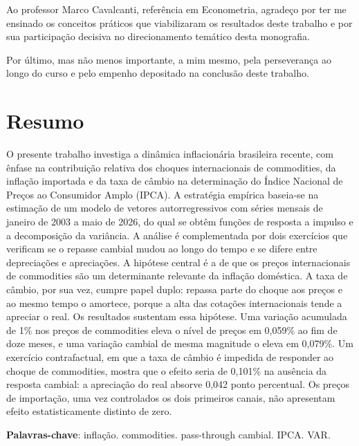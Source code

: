 \documentclass[12pt,openright,oneside,a4paper,portuguese,brazil]{abntex2}
\begin{document}
Ao professor Marco Cavalcanti, referência em Econometria, agradeço
por ter me ensinado os conceitos práticos que viabilizaram os
resultados deste trabalho e por sua participação decisiva no
direcionamento temático desta monografia.

Por último, mas não menos importante, a mim mesmo, pela
perseverança ao longo do curso e pelo empenho depositado na
conclusão deste trabalho.
\newpage



\section*{Resumo}
\justifying
\hspace{1em}
O presente trabalho investiga a dinâmica inflacionária brasileira recente,
com ênfase na contribuição relativa dos choques internacionais de
commodities, da inflação importada e da taxa de câmbio na determinação
do Índice Nacional de Preços ao Consumidor Amplo (IPCA). A estratégia
empírica baseia-se na estimação de um modelo de vetores autorregressivos com
séries mensais de janeiro de 2003 a maio de 2026, do qual se obtêm funções de
resposta a impulso e a decomposição da variância. A análise é complementada por
dois exercícios que verificam se o repasse cambial mudou ao longo do tempo e se
difere entre depreciações e apreciações. A hipótese central é a de que os preços internacionais de commodities são um
determinante relevante da inflação doméstica. A taxa de câmbio, por sua vez,
cumpre papel duplo: repassa parte do choque aos preços e ao mesmo tempo o
amortece, porque a alta das cotações internacionais tende a apreciar o real.
Os resultados sustentam essa hipótese. Uma variação acumulada de 1\% nos
preços de commodities eleva o nível de preços em 0,059\% ao fim de doze meses,
e uma variação cambial de mesma magnitude o eleva em 0,079\%. Um exercício
contrafactual, em que a taxa de câmbio é impedida de responder ao choque de
commodities, mostra que o efeito seria de 0,101\% na ausência da resposta
cambial: a apreciação do real absorve 0,042 ponto percentual. Os preços de
importação, uma vez controlados os dois primeiros canais, não apresentam
efeito estatisticamente distinto de zero.

\vspace{\onelineskip}

\noindent\textbf{Palavras-chave}: inflação. commodities. pass-through
cambial. IPCA. VAR.

\newpage
\end{document}
